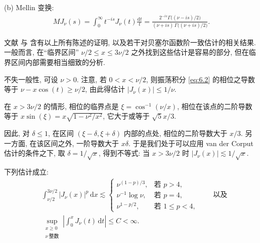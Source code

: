 (b) Mellin 变换:
\begin{align*}
  M J_{\nu}(s)=\int_{0}^{\infty}t^{-is}J_{\nu}(t)\frac{\mathrm{d}t}{t}
  =\frac{2^{-is}\Gamma\bigl((\nu-is)/2\bigr)}{(\nu+is)\,\Gamma\bigl((\nu+is)/2\bigr)}.
\end{align*}

文献 \cite{b16} 与 \cite{b147} 含有以上所有陈述的证明, 以及若干对贝塞尔函数阶一致估计的相关结果. 一般而言, 在``临界区间'' $\nu/2 \leq x \leq 3\nu/2$ 之外找到这些估计是容易的部分, 但在临界区间内部需要相当细致的分析.

不失一般性, 可设 $\nu > 0$. 注意, 若 $0 < x < \nu/2$, 则振荡积分 \eqref{eq:6.2} 的相位之导数等于 $\nu - x\cos(t) \geq \nu/2$, 由此得估计 $|J_\nu(x)| \leq 1/\nu$.

在 $x > 3\nu/2$ 的情形, 相位的临界点是 $\xi = \cos^{-1}(\nu/x)$, 相位在该点的二阶导数等于 $x\sin(\xi) = x\sqrt{1 - \nu^2/x^2}$, 它大于或等于 $\sqrt{5}x/3$.

因此, 对 $\delta \leq 1$, 在区间 $(\xi - \delta, \xi + \delta)$ 内部的点处, 相位的二阶导数大于 $x/3$. 另一方面, 在该区间之外, 一阶导数大于 $x\delta$. 于是我们处于可以应用 van der Corput 估计的条件之下, 取 $\delta = 1/\sqrt{x}$, 得到不等式: 当 $x > 3\nu/2$ 时 $|J_\nu(x)| \lesssim 1/\sqrt{x}$.

\begin{theorem}\label{thm:6.1}
下列估计成立:
\begin{align*}
  &\int_{\nu/2}^{3\nu/2}|J_{\nu}(x)|^{p}\,\mathrm{d}x
  \lesssim\begin{cases}
    \nu^{(1-p)/3}, & \text{若 } p>4,\\
    \nu^{-1}\log\nu, & \text{若 } p=4,\\
    \nu^{1-p/2}, & \text{若 } 1\leq p<4,
  \end{cases}
  \qquad\text{以及}\\
  &\sup_{\substack{x\geq 0\\ \nu\ \text{整数}}}
  \left|\int_{0}^{x}J_{\nu}(t)\,\mathrm{d}t\right|\leq C<\infty.
\end{align*}
\end{theorem}

